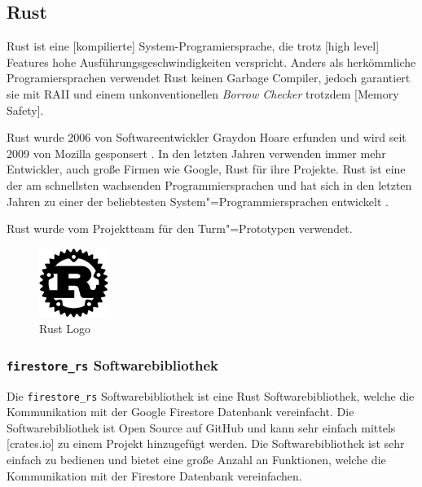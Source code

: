 \subsection{Rust}
\label{sec:rust}

Rust ist eine [kompilierte] System-Programiersprache, die trotz [high level] Features hohe Ausführungsgeschwindigkeiten verspricht. Anders als herkömmliche Programiersprachen verwendet Rust keinen Garbage Compiler, jedoch garantiert sie mit \ac{RAII} und einem unkonventionellen \textit{Borrow Checker} trotzdem [Memory Safety].

\bigskip


\noindent Rust wurde 2006 von Softwareentwickler Graydon Hoare erfunden und wird seit 2009 von Mozilla gesponsert . In den letzten Jahren verwenden immer mehr Entwickler, auch große Firmen wie Google, Rust für ihre Projekte. Rust ist eine der am schnellsten wachsenden Programmiersprachen und hat sich in den letzten Jahren zu einer der beliebtesten System"=Programmiersprachen entwickelt .

\noindent Rust wurde vom Projektteam für den Turm"=Prototypen verwendet.

\begin{figure}[H]
    \centering
    \includegraphics[width=0.20\textwidth]{images/rust_logo.png}
    \caption{Rust Logo}
    \label{fig:rust_logo}
\end{figure}

\subsubsection{\texttt{firestore\_rs} Softwarebibliothek}
\label{sec:firestore_rs}

Die \texttt{firestore\_rs} Softwarebibliothek ist eine Rust Softwarebibliothek, welche die Kommunikation mit der Google Firestore Datenbank vereinfacht. Die Softwarebibliothek ist Open Source auf GitHub und kann sehr einfach mittels [crates.io] zu einem Projekt hinzugefügt werden. Die Softwarebibliothek ist sehr einfach zu bedienen und bietet eine große Anzahl an Funktionen, welche die Kommunikation mit der Firestore Datenbank vereinfachen.

